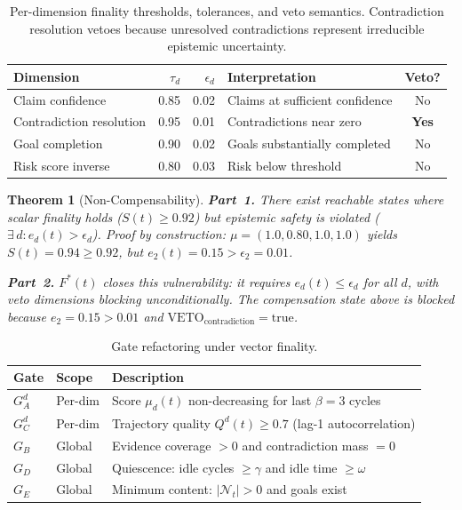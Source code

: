 \documentclass[11pt]{article}
\newtheorem{theorem}{Theorem}
\begin{document}
\begin{table}[H]
\centering
\small
\begin{tabular}{lrrl|c}
\toprule
\textbf{Dimension} & $\tau_d$ & $\epsilon_d$ & \textbf{Interpretation} & \textbf{Veto?} \\
\midrule
Claim confidence & 0.85 & 0.02 & Claims at sufficient confidence & No \\
Contradiction resolution & 0.95 & 0.01 & Contradictions near zero & \textbf{Yes} \\
Goal completion & 0.90 & 0.02 & Goals substantially completed & No \\
Risk score inverse & 0.80 & 0.03 & Risk below threshold & No \\
\bottomrule
\end{tabular}
\caption{Per-dimension finality thresholds, tolerances, and veto semantics.
Contradiction resolution vetoes because unresolved contradictions represent irreducible epistemic uncertainty.}
\label{tab:vector-finality-thresholds}
\end{table}

\begin{theorem}[Non-Compensability]
\label{thm:vector-finality-soundness}
\textbf{Part~1.}
There exist reachable states where scalar finality holds ($S(t) \geq 0.92$) but epistemic safety is violated ($\exists\, d : e_d(t) > \epsilon_d$).
\emph{Proof by construction:} $\mu = (1.0, 0.80, 1.0, 1.0)$ yields $S(t) = 0.94 \geq 0.92$, but $e_2(t) = 0.15 > \epsilon_2 = 0.01$.

\textbf{Part~2.}
$F^*(t)$ closes this vulnerability: it requires $e_d(t) \leq \epsilon_d$ for all $d$, with veto dimensions blocking unconditionally.
The compensation state above is blocked because $e_2 = 0.15 > 0.01$ and $\mathrm{VETO}_{\mathrm{contradiction}} = \mathrm{true}$.
\end{theorem}

\begin{table}[H]
\centering
\small
\begin{tabular}{llp{6.5cm}}
\toprule
\textbf{Gate} & \textbf{Scope} & \textbf{Description} \\
\midrule
$G_A^d$ & Per-dim & Score $\mu_d(t)$ non-decreasing for last $\beta{=}3$ cycles \\
$G_C^d$ & Per-dim & Trajectory quality $Q^d(t) \geq 0.7$ (lag-1 autocorrelation) \\
$G_B$ & Global & Evidence coverage $> 0$ and contradiction mass $= 0$ \\
$G_D$ & Global & Quiescence: idle cycles $\geq \gamma$ and idle time $\geq \omega$ \\
$G_E$ & Global & Minimum content: $|\mathcal{N}_t| > 0$ and goals exist \\
\bottomrule
\end{tabular}
\caption{Gate refactoring under vector finality.}
\label{tab:gate-refactoring}
\end{table}
\end{document}
